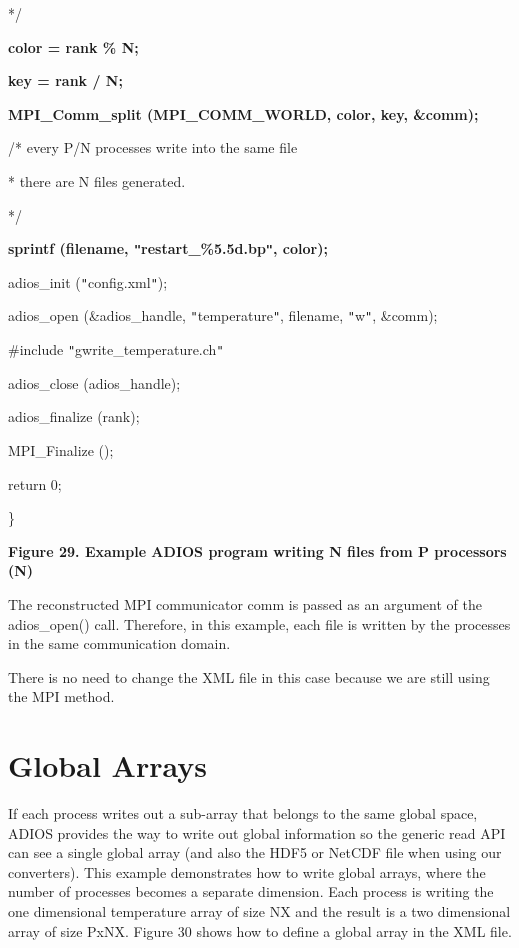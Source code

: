 */

\parindent=0pt
{\color{color02} \textbf{color = rank \% N;}}

{\color{color02} \textbf{key = rank / N;}}

{\color{color02} \textbf{MPI\_Comm\_split (MPI\_COMM\_WORLD, color, key, \&comm);}}

/* every P/N processes write into the same file 

\parindent=7pt
* there are N files generated. 

*/

\parindent=0pt
{\color{color02} \textbf{sprintf (filename, \texttt{"}restart\_\%5.5d.bp\texttt{"}, 
color);}}

adios\_init (\texttt{"}config.xml\texttt{"});

adios\_open (\&adios\_handle, \texttt{"}temperature\texttt{"}, filename, \texttt{"}w\texttt{"}, 
\&comm);

\#include \texttt{"}gwrite\_temperature.ch\texttt{"}

adios\_close (adios\_handle);

adios\_finalize (rank);

MPI\_Finalize ();

return 0;

\leftskip=0pt
\}

\label{HRef119579635}\label{HToc144350188}

\leftskip=18pt
{\color{color20} \textbf{Figure 29. Example ADIOS program writing N files from 
P processors (N)}}

\leftskip=0pt
The reconstructed MPI communicator comm is passed as an argument of the adios\_open() 
call. Therefore, in this example, each file is written by the processes in the 
same communication domain.

There is no need to change the XML file in this case because we are still using 
the MPI method. \label{HToc84890299}\label{HToc212016675}\label{HToc212016917}\label{HRef119999389}\label{HToc182553447}

\section{Global Arrays}
\label{section-globalarrays}

If each process writes out a sub-array that belongs to the same global space, ADIOS 
provides the way to write out global information so the generic read API can see 
a single global array (and also the HDF5 or NetCDF file when using our converters). 
This example demonstrates how to write global arrays, where the number of processes 
becomes a separate dimension. Each process is writing the one dimensional temperature 
array of size NX and the result is a two dimensional array of size PxNX. Figure 
30 shows how to define a global array in the XML file. 

